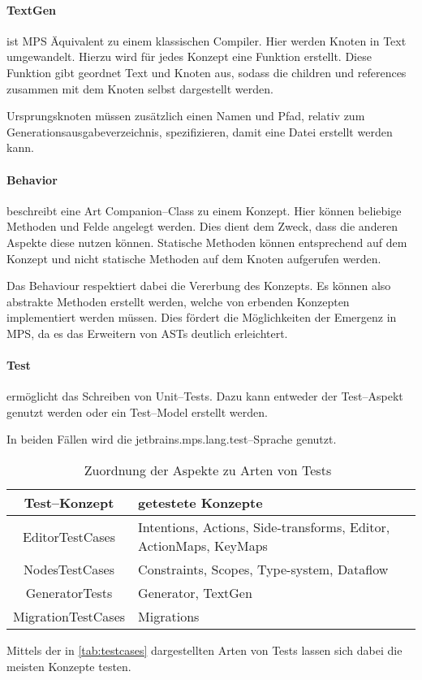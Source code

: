 \paragraph{TextGen} ist \ac{MPS} Äquivalent zu einem klassischen Compiler.
Hier werden Knoten in Text umgewandelt.
Hierzu wird für jedes Konzept eine Funktion erstellt.
Diese Funktion gibt geordnet Text und Knoten aus, sodass die {\ttfamily children} und {\ttfamily references} zusammen mit dem Knoten selbst dargestellt werden.

Ursprungsknoten müssen zusätzlich einen Namen und Pfad, relativ zum Generationsausgabeverzeichnis, spezifizieren, damit eine Datei erstellt werden kann.

\paragraph{Behavior} beschreibt eine Art Companion--Class zu einem Konzept.
Hier können beliebige Methoden und Felde angelegt werden.
Dies dient dem Zweck, dass die anderen Aspekte diese nutzen können.
Statische Methoden können entsprechend auf dem Konzept und nicht statische Methoden auf dem Knoten aufgerufen werden.

Das Behaviour respektiert dabei die Vererbung des Konzepts.
Es können also abstrakte Methoden erstellt werden, welche von erbenden Konzepten implementiert werden müssen.
Dies fördert die Möglichkeiten der Emergenz in \ac{MPS}, da es das Erweitern von \acp{AST} deutlich erleichtert.

\paragraph{Test} ermöglicht das Schreiben von Unit--Tests.
Dazu kann entweder der Test--Aspekt genutzt werden oder ein Test--Model erstellt werden.

In beiden Fällen wird die {\ttfamily jetbrains.mps.lang.test}--Sprache genutzt.
\begin{table}[ht]
    \centering
    \begin{tabular}{|c|p{\textwidth-5cm}|}
        \hline
        \textbf{Test--Konzept}    & \textbf{getestete Konzepte}                                       \\
        \hline
        \hline
        {\ttfamily EditorTestCases}    & Intentions, Actions, Side-transforms, Editor, ActionMaps, KeyMaps \\
        \hline
        {\ttfamily NodesTestCases}     & Constraints, Scopes, Type-system, Dataflow                        \\
        \hline
        {\ttfamily GeneratorTests}     & Generator, TextGen                                                \\
        \hline
        {\ttfamily MigrationTestCases} & Migrations                                                        \\
        \hline
    \end{tabular}
    \caption{Zuordnung der Aspekte zu Arten von Tests~\autocite{jetbrains-sro-no-dateE}}
    \label{tab:testcases}
\end{table}
Mittels der in \autoref{tab:testcases} dargestellten Arten von Tests lassen sich dabei die meisten Konzepte testen.

